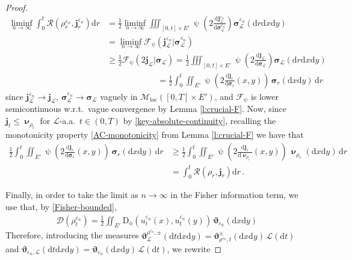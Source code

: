 \documentclass[11pt,reqno]{amsart}
\numberwithin{equation}{section}
\newcommand{\calF}{\mathcal{F}}
\newcommand{\scrL}{\mathscr{L}}
\newcommand{\eps}{\varepsilon}
\newcommand{\dd}{\mathrm{d}}
\theoremstyle{definition}
\newcommand{\ep}{\varepsilon}
\let\eps\ep
\def\dd{\mathrm{d}}
\newcommand{\Fish}{\mathscr{D}}
\newcommand{\teta}{\boldsymbol \vartheta}
\newcommand{\tetapien}{\boldsymbol{\teta}_{\eps_n}}
\def\calF{\mathscr F}
\newcommand{\Lebone}{\scrL}
\newcommand{\bnu}{\boldsymbol\upnu}
\newcommand{\bj}{{\boldsymbol j}}
\newcommand{\scrR}{\mathscr{R}}
\newcommand{\jj}{{\boldsymbol{j}}}
\newcommand{\Ed}{{E'}}
\newcommand{\Mloc}{\mathcal{M}_{\mathrm{loc}}}
\newcommand{\ej}{\eps_n}
\newcommand{\ssigma}{\boldsymbol \sigma}
\newcommand{\RNEW}{\color{black}} %
\newcommand{\EEE}{\color{black}}
\numberwithin{equation}{section}
\begin{document}
\begin{proof}
\begin{equation}
\label{lsc-R}
\begin{aligned}
\liminf_{n\to\infty} \int_0^t 
 \scrR(\rho_r^{\ej},\bj_r^{\ej}) \dd r  & =  \frac12 \liminf_{n\to\infty}  \iiint_{[0,t]{\times}\Ed} \uppsi \left(2\frac{\dd \jj_{\Lebone}^{\ej}}{\dd \ssigma_{\Lebone}^{\ej}}  \right)  \ssigma_{\Lebone}^{\ej} (\dd r \dd x \dd y) \\ & 
  = \liminf_{n\to\infty}  \calF_{\uppsi}\left( \jj_{\Lebone}^{\ej}|\ssigma_{\Lebone}^{\ej} \right) 
  \\
  &
  \geq 
   \frac12 \calF_{\uppsi}\left( 2\jj_{\Lebone}|\ssigma_{\Lebone} \right) 
 = \frac12 \iiint_{[0,t]{\times}\Ed} \uppsi \left(2\frac{\dd \jj_{\Lebone}}{\dd \ssigma_{\Lebone}}  \right)  \ssigma_{\Lebone} (\dd r \dd x \dd y)
 \\
 & \qquad \qquad \qquad = \frac12 \int_0^t \iint_{\Ed} \uppsi \left( 2\frac{\dd \jj_{r}}{\dd \ssigma_{r}}  (x,y) \right) \,  \ssigma_r (\dd x \dd y)\, \dd r
 \end{aligned}
 \end{equation}
 since $ \jj_{\Lebone}^{\ej} \to \jj_\Lebone$, $ \ssigma_{\Lebone}^{\ej} \to \ssigma_\Lebone$
 \RNEW vaguely in $\Mloc([0,T]{\times}\Ed)$, 
  and $\mathcal{F}_{\uppsi}$ is lower semicontinuous w.r.t.\ vague convergence by Lemma 
 \ref{l:crucial-F}. 
 Now,
 since $\bj_t \leq \bnu_{\rho_t}$ for $\Lebone$-a.a.\ $t\in (0,T)$ by \eqref{key-absolute-continuity}, recalling the monotonicity property
 \eqref{AC-monotonicity} from Lemma \ref{l:crucial-F}
  we have that 
 \[
 \begin{aligned}
 \frac12 \int_0^t \iint_{\Ed} \uppsi \left(2\frac{\dd \jj_{r}}{\dd \ssigma_{r}}  (x,y) \right) \,  \ssigma_r (\dd x \dd y)\, \dd r  & \geq \frac12  \int_0^t 
  \iint_{\Ed} \uppsi \left(2\frac{\dd \jj_{r}}{\dd \bnu_{\rho_r}}  (x,y) \right) \,  \bnu_{\rho_r}(\dd x \dd y)\, \dd r 
  \\
  & 
  =
 \int_0^t \scrR(\rho_r,\bj_r) \dd r\,.
 \end{aligned}
 \] \EEE
 \par
Finally, in order to take the limit as $n\to\infty$ in the Fisher information term, we use that, by \eqref{Fisher-bounded}, 
 \[
 \begin{aligned}
\Fish(\rho_t^{\ej})  = \frac12 \iint_{E'}  \mathrm{D}_\upphi(u_t^{\ej}(x),u_t^{\ej}(y)) \, \tetapien(\dd x \dd y)
\end{aligned}
\]
Therefore, introducing the measures $\teta_{\Lebone}^{\rho^{\ej},\pm}(\dd t \dd x \dd y) = \teta_{\rho^{\ej},t}^{\pm} (\dd x \dd y) \, \Lebone (\dd t)$ and 
$\teta_{\ej,\Lebone}(\dd t \dd x \dd y) = \teta_{\ej}(\dd x \dd y) \, \Lebone (\dd t)$, we rewrite

\end{proof}
\end{document}
